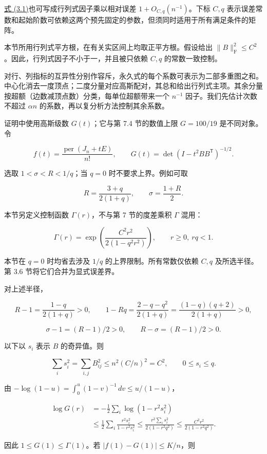 \documentclass[11pt,a4paper]{article}
\begin{document}
\hyperref[eq-uniform-permanent]{式 (3.1)}也可写成行列式因子乘以相对误差 \(1+O_{C,q}(n^{-1})\)。下标 \(C,q\) 表示误差常数和起始阶数可依赖这两个预先固定的参数，但须同时适用于所有满足条件的矩阵。

本节所用行列式平方根，在有关实区间上均取正平方根。假设给出 \(\|B\|_{\mathrm F}^2\le C^2\)。因此，行列式因子不小于一，并且被只依赖 \(C,q\) 的常数一致控制。

对行、列指标的互异性分别作容斥，永久式的每个系数可表示为二部多重图之和。中心化消去一度顶点；二度分量对应高斯配对，其总和给出行列式主项。其余分量按超额（边数减顶点数）分类，每单位超额带来一个 \(n^{-1}\) 因子。我们先估计次数不超过 \(\alpha n\) 的系数，再以复分析方法控制其余系数。

证明中使用高斯级数 \(G(t)\)；它与第 7.4 节的数值上限 \(G=100/19\) 是不同对象。令

\[
f(t)=\frac{\operatorname{per}(J_n+tE)}{n!},
\qquad G(t)=\det(I-t^2BB^{\mathsf T})^{-1/2}.
\]

选取 \(1<\sigma<R<1/q\)；当 \(q=0\) 时不要求上界。例如可取

\[
R=\frac{3+q}{2(1+q)},\qquad \sigma=\frac{1+R}{2}.
\]

本节另定义控制函数 \(\Gamma(r)\)，不与第 7 节的度差乘积 \(\Gamma\) 混用：

\[
\Gamma(r)=\exp\left(\frac{C^2r^2}{2(1-q^2r^2)}\right),
\qquad r\ge0,\ rq<1.
\]

本节在 \(q=0\) 时均省去涉及 \(1/q\) 的上界限制。所有常数仅依赖 \(C,q\) 及所选半径。第 3.6 节将它们合并为显式误差界。

对上述半径，

\[
R-1=\frac{1-q}{2(1+q)}>0,\qquad
1-Rq=\frac{2-q-q^2}{2(1+q)}=\frac{(1-q)(q+2)}{2(1+q)}>0,
\]

\[
\sigma-1=(R-1)/2>0,\qquad R-\sigma=(R-1)/2>0.
\]

以下以 \(s_i\) 表示 \(B\) 的奇异值。则

\[
\sum_i s_i^2=\sum_{i,j}B_{ij}^2\le n^2(C/n)^2=C^2,\qquad
0\le s_i\le q.
\]

由 \(-\log(1-u)=\int_0^u(1-v)^{-1}\,dv\le u/(1-u)\)，

\[
\begin{aligned}
\log G(r)&=-\frac12\sum_i\log(1-r^2s_i^2)\\
&\le\frac12\sum_i\frac{r^2s_i^2}{1-r^2s_i^2}
\le\frac{r^2\sum_i s_i^2}{2(1-r^2q^2)}
\le\frac{C^2r^2}{2(1-r^2q^2)}.
\end{aligned}
\]

因此 \(1\le G(1)\le\Gamma(1)\)。若 \(|f(1)-G(1)|\le K/n\)，则
\end{document}
